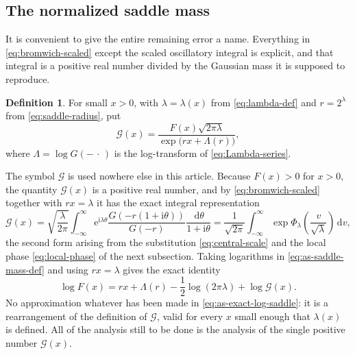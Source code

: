 \documentclass[11pt,oneside]{article}
\theoremstyle{definition}
\newtheorem{definition}[theorem]{Definition}
\theoremstyle{remark}
\newcommand{\e}{\mathrm e}
\newcommand{\ii}{\mathrm i}
\newcommand{\dd}{\,\mathrm d}
\begin{document}
\subsection{The normalized saddle mass}
\label{subsec:as-saddle-mass}

It is convenient to give the entire remaining error a name.  Everything in
\eqref{eq:bromwich-scaled} except the scaled oscillatory integral is explicit, and that
integral is a positive real number divided by the Gaussian mass it is supposed to reproduce.

\begin{definition}
\label{def:as-saddle-mass}
For small $x>0$, with $\lambda=\lambda(x)$ from \eqref{eq:lambda-def} and $r=2^{\lambda}$
from \eqref{eq:saddle-radius}, put
\begin{equation}
 \mathcal G(x)=
 \frac{F(x)\sqrt{2\pi\lambda}}
      {\exp\bigl(rx+\Lambda(r)\bigr)},                    \label{eq:as-saddle-mass-def}
\end{equation}
where $\Lambda=\log G(-\,\cdot\,)$ is the log-transform of \eqref{eq:Lambda-series}.
\end{definition}

The symbol $\mathcal G$ is used nowhere else in this article.  Because $F(x)>0$ for $x>0$,
the quantity $\mathcal G(x)$ is a positive real number, and by \eqref{eq:bromwich-scaled}
together with $rx=\lambda$ it has the exact integral representation
\begin{equation}
 \mathcal G(x)=\sqrt{\frac{\lambda}{2\pi}}
 \int_{-\infty}^{\infty}
 \e^{\ii\lambda\theta}
 \frac{G(-r(1+\ii\theta))}{G(-r)}
 \frac{\dd\theta}{1+\ii\theta}
 =\frac1{\sqrt{2\pi}}\int_{-\infty}^{\infty}
 \exp\Phi_\lambda\!\left(\frac{v}{\sqrt\lambda}\right)\dd v, \label{eq:as-saddle-mass-integral}
\end{equation}
the second form arising from the substitution \eqref{eq:central-scale} and the local phase
\eqref{eq:local-phase} of the next subsection.  Taking logarithms in
\eqref{eq:as-saddle-mass-def} and using $rx=\lambda$ gives the exact identity
\begin{equation}
 \boxed{
 \log F(x)=rx+\Lambda(r)-\frac12\log(2\pi\lambda)+\log\mathcal G(x).}
                                                          \label{eq:as-exact-log-saddle}
\end{equation}
No approximation whatever has been made in \eqref{eq:as-exact-log-saddle}: it is a
rearrangement of the definition of $\mathcal G$, valid for every $x$ small enough that
$\lambda(x)$ is defined.  All of the analysis still to be done is the analysis of the single
positive number $\mathcal G(x)$.
\end{document}
